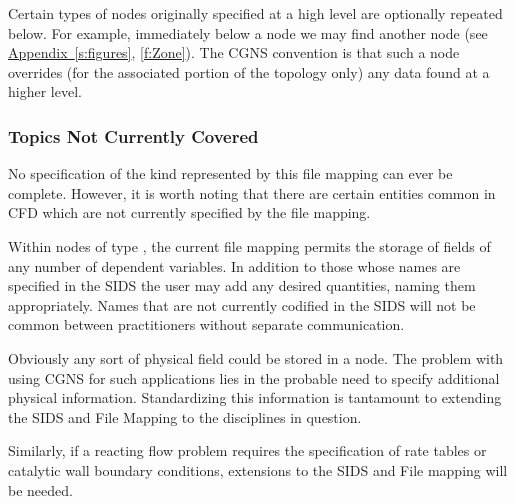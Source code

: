 Certain types of nodes originally specified at a high level are
optionally repeated below. For example, immediately below a
 node we may find another 
node (see \hyperref[s:figures]{Appendix~\ref*{s:figures}},
\autoref{f:Zone}). The CGNS convention is that such a node overrides
(for the associated portion of the topology only) any data found at a
higher level.

\subsubsection{Topics Not Currently Covered}
\label{s:notcovered}

No specification of the kind represented by this file mapping can ever
be complete. However, it is worth noting that there are certain entities
common in CFD which are not currently specified by the file mapping.

Within nodes of type , the current file mapping
permits the storage of fields of any number of dependent variables.
In addition to those whose names are specified in the SIDS the user may
add any desired quantities, naming them appropriately.
Names that are not currently codified in the SIDS will not be
common between practitioners without separate communication.

Obviously any sort of physical field could be stored in a
 node.
The problem with using CGNS for such applications lies in the probable
need to specify additional physical information.
Standardizing this information is tantamount to extending the SIDS and
File Mapping to the disciplines in question.

Similarly, if a reacting flow problem requires the specification of rate
tables or catalytic wall boundary conditions, extensions to the SIDS and
File mapping will be needed.
